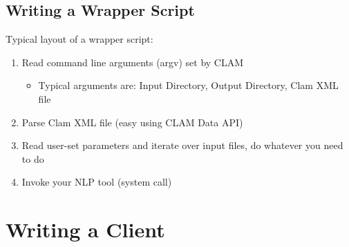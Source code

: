 \documentclass[compress]{beamer}
\begin{document}
\subsection{Writing a Wrapper Script}

\begin{frame}
    \begin{block}
        Typical layout of a wrapper script:
        \begin{enumerate}
            \item Read command line arguments (argv) set by CLAM
            \begin{itemize}
                \item Typical arguments are: Input Directory, Output Directory, Clam XML file            
            \end{itemize}
            \item Parse Clam XML file (easy using CLAM Data API)
            \item Read user-set parameters and iterate over input files, do whatever you need to do
            \item Invoke your NLP tool (system call)                
        \end{enumerate}
    \end{block}
\end{frame}        

\section{Writing a Client}
\end{document}
